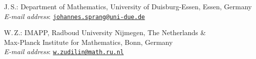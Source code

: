\documentclass[12pt]{article}
\theoremstyle{remark}
\numberwithin{equation}{section}
\begin{document}
\begin{flushright}
\begin{minipage}{148mm}\sc\footnotesize
J.\,S.: Department of Mathematics, University of Duisburg-Essen, Essen, Germany \\
{\it E-mail address}: \href{mailto:johannes.sprang@uni-due.de}{{\tt johannes.sprang@uni-due.de}} \vspace*{3mm}
\end{minipage}
\end{flushright}

\begin{flushright}
\begin{minipage}{148mm}\sc\footnotesize
W.\,Z.: IMAPP, Radboud University Nijmegen, The Netherlands \& \\ Max-Planck Institute for Mathematics, Bonn, Germany\\
{\it E-mail address}: \href{mailto:w.zudilin@math.ru.nl}{{\tt w.zudilin@math.ru.nl}} \vspace*{3mm}
\end{minipage}
\end{flushright}
\end{document}

